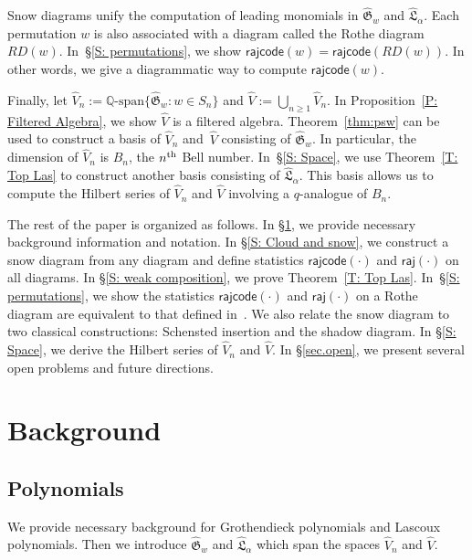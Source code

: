 \documentclass[10pt]{amsart}
\theoremstyle{plain}
\theoremstyle{plain}
\theoremstyle{definition}
\theoremstyle{definition}
\theoremstyle{definition}
\theoremstyle{plain}
\theoremstyle{plain}
\theoremstyle{plain}
\theoremstyle{plain}
\theoremstyle{plain}
\theoremstyle{remark}
\theoremstyle{remark}
\theoremstyle{plain}
\theoremstyle{plain}
\newcommand{\fG}{\mathfrak{G}}
\newcommand{\fL}{\mathfrak{L}}
\newcommand{\topLas}{\widehat{\fL}}
\newcommand{\topGro}{\widehat{\fG}}
\newcommand{\Q}{\mathbb{Q}}
\newcommand{\rajcode}{\mathsf{rajcode}}
\newcommand{\raj}{\mathsf{raj}}
\begin{document}
Snow diagrams unify the computation of leading monomials in $\topGro_w$ and $\topLas_\alpha$.
Each permutation $w$ is also associated
with a diagram called the Rothe diagram
$RD(w)$.
In~\S\ref{S: permutations},
we show $\rajcode(w) = \rajcode(RD(w))$.
In other words, we give a diagrammatic way to compute $\rajcode(w)$.

Finally, let $\widehat{V}_n :=  \Q\textrm{-span}\{\topGro_w: w \in S_n\}$ and $\widehat{V} :=  
\bigcup_{n \geq 1} \widehat{V}_n$.
In Proposition~\ref{P: Filtered Algebra},
we show $\widehat{V}$
is a filtered algebra. 
Theorem~\ref{thm:psw} can be used to construct a basis of $\widehat{V}_n$
and~$\widehat{V}$ 
consisting of $\topGro_w$.
In particular, 
the dimension of $\widehat{V}_n$
is $B_n$, the $n\textsuperscript{th}$ Bell number.
In~\S\ref{S: Space},
we use Theorem~\ref{T: Top Las} to construct another basis consisting of $\topLas_\alpha$.
This basis allows us to compute the Hilbert series of $\widehat{V}_n$ 
and $\widehat{V}$
involving a $q$-analogue of $B_n$.

The rest of the paper is organized as follows. 
In \S\ref{S: Background}, we provide necessary background information and notation.
In \S\ref{S: Cloud and snow}, we construct a snow diagram from any diagram 
and define statistics $\rajcode(\cdot)$ and $ \raj(\cdot)$ on all diagrams.
In \S\ref{S: weak composition}, we  prove Theorem~\ref{T: Top Las}.
In~\S\ref{S: permutations}, we show the statistics $\rajcode(\cdot)$ and $\raj(\cdot)$ 
on a Rothe diagram are equivalent to that defined in~\cite{PSW}.
We also relate the snow diagram to two classical constructions: 
Schensted insertion and the shadow diagram.
In \S\ref{S: Space}, we derive the Hilbert series 
of $\widehat{V}_n$ and $\widehat{V}$.
In \S\ref{sec.open}, we present several open problems and future directions.

\section{Background}
\label{S: Background}
\subsection{Polynomials}
We provide necessary background
for Grothendieck polynomials and Lascoux polynomials.
Then we introduce
$\topGro_w$ and $\topLas_\alpha$ 
which span the spaces $\widehat{V}_n$ and $\widehat{V}$. 
\end{document}
